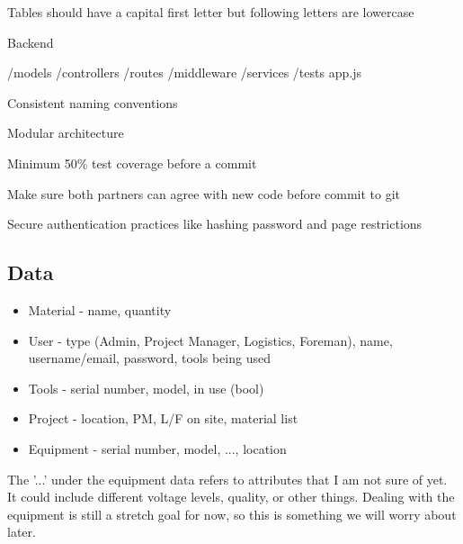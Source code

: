 \documentclass{article}
\begin{document}
Tables should have a capital first letter but following letters are lowercase

Backend

/models
/controllers
/routes
/middleware
/services
/tests
app.js

Consistent naming conventions

Modular architecture

Minimum 50\% test coverage before a commit

Make sure both partners can agree with new code before commit to git

Secure authentication practices like hashing password and page restrictions




\subsection{Data}


\begin{itemize}
    \item Material - name, quantity
    \item User - type (Admin, Project Manager, Logistics, Foreman), name, username/email, password, tools being used
    \item Tools - serial number, model, in use (bool)
    \item Project - location, PM, L/F on site, material list
    \item Equipment - serial number, model, ..., location
\end{itemize}

The '...' under the equipment data refers to attributes that I am not sure of yet. It could include different voltage levels, quality, or other things. Dealing with the equipment is still a stretch goal for now, so this is something we will worry about later. 
\end{document}
